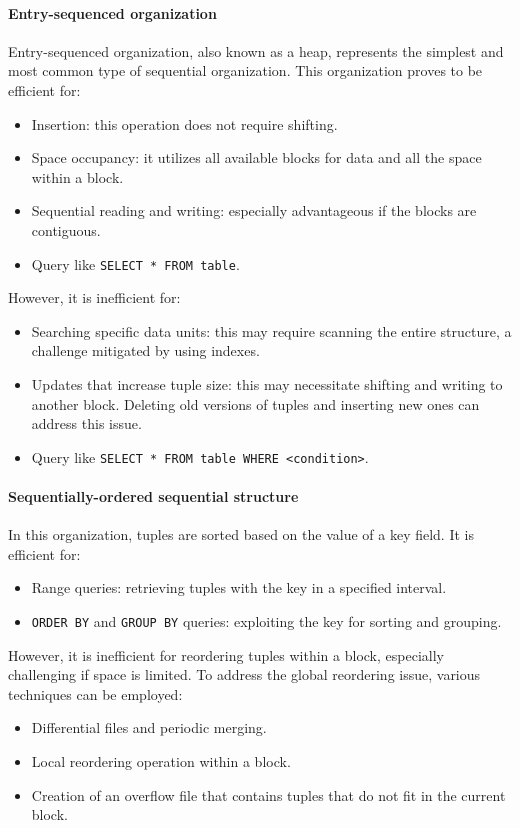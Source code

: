 \paragraph*{Entry-sequenced organization}
Entry-sequenced organization, also known as a heap, represents the simplest and most common type of sequential organization. 
This organization proves to be efficient for:
\begin{itemize}
    \item Insertion: this operation does not require shifting. 
    \item Space occupancy: it utilizes all available blocks for data and all the space within a block.
    \item Sequential reading and writing: especially advantageous if the blocks are contiguous.
    \item Query like \texttt{SELECT * FROM table}. 
\end{itemize}
However, it is inefficient for:
\begin{itemize}
    \item Searching specific data units: this may require scanning the entire structure, a challenge mitigated by using indexes.
    \item Updates that increase tuple size: this may necessitate shifting and writing to another block. 
        Deleting old versions of tuples and inserting new ones can address this issue.
    \item Query like \texttt{SELECT * FROM table WHERE <condition>}.
\end{itemize}

\paragraph*{Sequentially-ordered sequential structure}
In this organization, tuples are sorted based on the value of a key field. 
It is efficient for:
\begin{itemize}
    \item Range queries: retrieving tuples with the key in a specified interval.
    \item \texttt{ORDER BY} and \texttt{GROUP BY} queries: exploiting the key for sorting and grouping.
\end{itemize}
However, it is inefficient for reordering tuples within a block, especially challenging if space is limited.
To address the global reordering issue, various techniques can be employed:
\begin{itemize}
    \item Differential files and periodic merging.
    \item Local reordering operation within a block.
    \item Creation of an overflow file that contains tuples that do not fit in the current block. 
\end{itemize}

